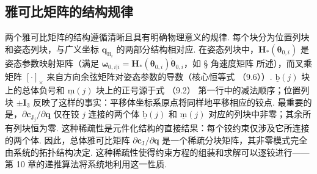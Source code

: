 \subsection{雅可比矩阵的结构规律}
两个雅可比矩阵的结构遵循清晰且具有明确物理意义的规律. 每个块分为位置列块和姿态列块，与广义坐标 $\boldsymbol{q}_{\text{B}_i}$ 的两部分结构相对应. 在姿态列块中，$\boldsymbol{H}_*(\boldsymbol{\theta}_{0,i})$ 是姿态参数映射矩阵（满足 $\boldsymbol{\omega}_{0,i|i} = \boldsymbol{H}_*(\boldsymbol{\theta}_{0,i}) \dot{\boldsymbol{\theta}}_{0,i}$，如 § 角速度矩阵 所述），而叉乘矩阵 $[\cdot]_\times$ 来自方向余弦矩阵对姿态参数的导数（核心恒等式 （9.6））. $\underline{\text{b}}(j)$ 块上的总体负号和 $\underline{\text{m}}(j)$ 块上的正号源于式 （9.2） 第一行中的减法顺序；位置列块 $\pm\boldsymbol{I}_3$ 反映了这样的事实：平移体坐标系原点将同样地平移相应的铰点.
最重要的是，$\partial \boldsymbol{c}_{\text{J}_j} / \partial \boldsymbol{q}$ 仅在铰 $j$ 连接的两个体 $\underline{\text{b}}(j)$ 和 $\underline{\text{m}}(j)$ 对应的列块中非零；其余所有列块恒为零. 这种稀疏性是元件化结构的直接结果：每个铰约束仅涉及它所连接的两个体. 因此，总体雅可比矩阵 $\partial \boldsymbol{c}_{\text{J}} / \partial \boldsymbol{q}$ 是一个稀疏分块矩阵，其非零模式完全由系统的拓扑结构决定. 这种稀疏性使得约束方程的组装和求解可以逐铰进行——第 10 章的递推算法将系统地利用这一性质.

